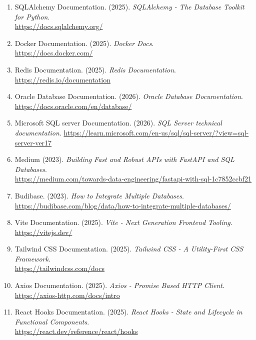 \documentclass[a4paper, 12pt]{article}
\begin{document}
\begin{enumerate}
    \item SQLAlchemy Documentation. (2025). \textit{SQLAlchemy - The Database Toolkit for Python}. \\
    \url{https://docs.sqlalchemy.org/}
    
    \item Docker Documentation. (2025). \textit{Docker Docs}. \\
    \url{https://docs.docker.com/}
    
    \item Redis Documentation. (2025). \textit{Redis Documentation}. \\
    \url{https://redis.io/documentation}

    \item Oracle Database Documentation. (2026). \textit{Oracle Database Documentation}.
    \url{https://docs.oracle.com/en/database/}

    \item Microsoft SQL server Documentation. (2026). \textit{SQL Server technical documentation}.
    \url{https://learn.microsoft.com/en-us/sql/sql-server/?view=sql-server-ver17}

    \item Medium (2023). \textit{Building Fast and Robust APIs with FastAPI and SQL Databases}. \\
    \url{https://medium.com/towards-data-engineering/fastapi-with-sql-1c7852ccbf21}
    
    \item Budibase. (2023). \textit{How to Integrate Multiple Databases}. \\
    \url{https://budibase.com/blog/data/how-to-integrate-multiple-databases/}
    
    \item Vite Documentation. (2025). \textit{Vite - Next Generation Frontend Tooling}. \\
    \url{https://vitejs.dev/}
    
    \item Tailwind CSS Documentation. (2025). \textit{Tailwind CSS - A Utility-First CSS Framework}. \\
    \url{https://tailwindcss.com/docs}
    
    \item Axios Documentation. (2025). \textit{Axios - Promise Based HTTP Client}. \\
    \url{https://axios-http.com/docs/intro}
    
    \item React Hooks Documentation. (2025). \textit{React Hooks - State and Lifecycle in Functional Components}. \\
    \url{https://react.dev/reference/react/hooks}


\end{enumerate}
\end{document}
